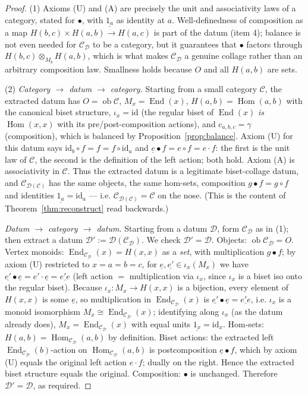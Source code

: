 \documentclass[11pt]{article}
\theoremstyle{definition}
\newcommand{\Hom}{\operatorname{Hom}}
\newcommand{\End}{\operatorname{End}}
\newcommand{\id}{\mathrm{id}}
\newcommand{\C}{\mathcal{C}}
\newcommand{\D}{\mathcal{D}}
\newcommand{\ob}{\operatorname{ob}}
\begin{document}
\begin{proof}
(1) Axioms (U) and (A) are precisely the unit and associativity laws of a
category, stated for $\bullet$, with $\underline{1_a}$ as identity at $a$.
Well-definedness of composition as a map $H(b,c)\times H(a,b)\to H(a,c)$ is part
of the datum (item 4); balance is not even needed for $\C_\D$ to be a category,
but it guarantees that $\bullet$ factors through
$H(b,c)\otimes_{M_b}H(a,b)$, which is what makes $\C_\D$ a genuine collage
rather than an arbitrary composition law. Smallness holds because $O$ and all
$H(a,b)$ are sets.

\medskip
\noindent(2) \emph{Category $\to$ datum $\to$ category.} Starting from a small
category $\C$, the extracted datum has $O=\ob\C$, $M_x=\End(x)$,
$H(a,b)=\Hom(a,b)$ with the canonical biset structure, $\iota_x=\id$ (the
regular biset of $\End(x)$ \emph{is} $\Hom(x,x)$ with its pre/post-composition
actions), and $c_{a,b,c}=\gamma$ (composition), which is balanced by
Proposition~\ref{prop:balance}. Axiom (U) for this datum says
$\id_b\circ f=f=f\circ\id_a$ and $\underline e\bullet f=e\circ f=e\cdot f$:
the first is the unit law of $\C$, the second is the definition of the left
action; both hold. Axiom (A) is associativity in $\C$. Thus the extracted
datum is a legitimate biset-collage datum, and $\C_{\D(\C)}$ has the same
objects, the same hom-sets, composition $g\bullet f=g\circ f$ and identities
$\underline{1_a}=\id_a$ --- i.e. $\C_{\D(\C)}=\C$ on the nose. (This is the
content of Theorem~\ref{thm:reconstruct} read backwards.)

\medskip
\noindent\emph{Datum $\to$ category $\to$ datum.} Starting from a datum $\D$,
form $\C_\D$ as in (1); then extract a datum $\D':=\D(\C_\D)$. We check
$\D'=\D$. Objects: $\ob\C_\D=O$. Vertex monoids: $\End_{\C_\D}(x)=H(x,x)$ as a
\emph{set}, with multiplication $g\bullet f$; by axiom (U) restricted to
$x=a=b=c$, for $\underline e,\underline{e'}\in\iota_x(M_x)$ we have
$\underline{e'}\bullet\underline e=e'\cdot\underline e=\underline{e'e}$ (left
action $=$ multiplication via $\iota_x$, since $\iota_x$ is a biset iso onto the
regular biset). Because $\iota_x:M_x\to H(x,x)$ is a bijection, every element of
$H(x,x)$ is some $\underline e$, so multiplication in $\End_{\C_\D}(x)$ is
$\underline{e'}\bullet\underline e=\underline{e'e}$, i.e.
$\iota_x$ is a monoid isomorphism $M_x\cong\End_{\C_\D}(x)$; identifying along
$\iota_x$ (as the datum already does), $M_x=\End_{\C_\D}(x)$ with equal units
$\underline{1_x}=\id_x$. Hom-sets: $H(a,b)=\Hom_{\C_\D}(a,b)$ by definition.
Biset actions: the extracted left $\End_{\C_\D}(b)$-action on $\Hom_{\C_\D}(a,b)$
is postcomposition $\underline e\bullet f$, which by axiom (U) equals the
original left action $e\cdot f$; dually on the right. Hence the extracted biset
structure equals the original. Composition: $\bullet$ is unchanged. Therefore
$\D'=\D$, as required.
\end{proof}
\end{document}
